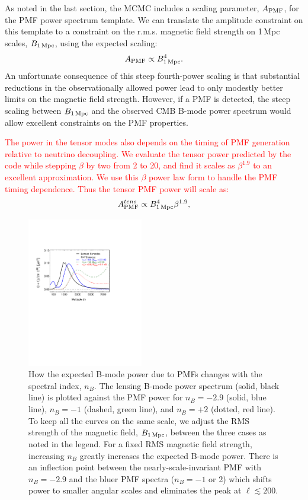 \documentclass[apj]{emulateapj}
\newcommand{\apmf}{\ensuremath{A_{\rm PMF}}}
\newcommand{\bpmf}{\ensuremath{B_{\rm 1\,Mpc}}}
\newcommand{\be}{\begin{equation}}
\newcommand{\ee}{\end{equation}}
\newcommand{\changed}[1]{\textcolor{Red}{#1}}
\begin{document}
As noted in the last section, the MCMC includes a  scaling parameter, \apmf{}, for the PMF power spectrum template. 
We can translate the amplitude constraint on this template to a constraint on the r.m.s. magnetic field strength on 1\,Mpc scales, \bpmf, using the expected scaling:
\be \label{eqn:scaling}
\apmf \propto \bpmf^4.
\ee
An unfortunate consequence of this steep fourth-power scaling is that substantial reductions in the observationally allowed power lead to only modestly better limits on the magnetic field strength. 
However, if a PMF is detected, the steep scaling between \bpmf{} and the observed CMB B-mode power spectrum would allow excellent constraints on the PMF properties.

\changed{The power in the tensor modes also depends on the timing of PMF generation relative to neutrino decoupling. 
We evaluate the tensor power predicted by the \citet{zucca16} code while stepping $\beta$ by two from 2 to 20, and find it scales as $\beta^{1.9}$ to an excellent approximation. 
We use this $\beta$ power law form to handle the PMF timing dependence. 
Thus the tensor PMF power will scale as:
\be \label{eqn:betascaling}
\apmf^{tens} \propto  \bpmf^4 \beta^{1.9},
\ee
}

\begin{figure}[htb]\centering
\includegraphics[width=0.45\textwidth,clip,trim={1.5cm 12.cm 5.5cm 4cm}]{pmf_templates_nb.pdf}
  \caption[CMB polarization from PMFs with different spectral indices]{ \label{fig:pmf-nb}
  How the expected B-mode power due to PMFs changes with the spectral index, $n_B$. 
  The lensing B-mode power spectrum (solid, black line) is plotted against the PMF power for $n_B=-2.9$ (solid, blue line), $n_B=-1$ (dashed, green line), and $n_B=+2$ (dotted, red line). 
  To keep all the curves on the same scale, we adjust the RMS strength of the magnetic field, \bpmf{}, between the three cases as noted in the legend. 
  For a fixed RMS magnetic field strength, increasing $n_B$ greatly increases the expected B-mode power. 
  There is an inflection point between the nearly-scale-invariant PMF with $n_B=-2.9$ and the bluer PMF spectra ($n_B=-1$ or 2) which shifts power to smaller angular scales and eliminates the peak at $\ell \lesssim 200$. 
  }
\end{figure}
 
\end{document}
